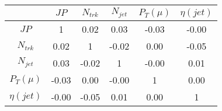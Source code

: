 \begin{tabular}{|c|c|c|c|c|c|} 
\hline
 & $JP$ & $N_{trk}$ & $N_{jet}$ & $P_{T} (\mu)$ & $\eta (jet)$ \\ \hline
$JP$ & 1 & 0.02 & 0.03 & -0.03 & -0.00 \\
$N_{trk}$ & 0.02 & 1 & -0.02 & 0.00 & -0.05 \\
$N_{jet}$ & 0.03 & -0.02 & 1 & -0.00 & 0.01 \\
$P_{T} (\mu)$ & -0.03 & 0.00 & -0.00 & 1 & 0.00 \\
$\eta (jet)$ & -0.00 & -0.05 & 0.01 & 0.00 & 1 \\
\hline 
\end{tabular} 


